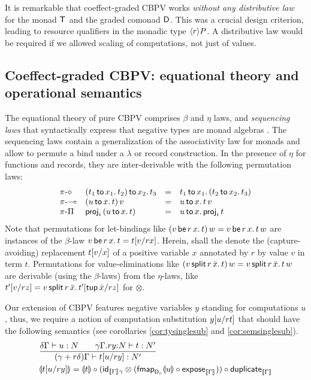 \documentclass[acmsmall,review,anonymous]{acmart}\settopmatter{printfolios=true,printccs=false,printacmref=false}
\begin{document}
It is remarkable that coeffect-graded CBPV works \emph{without any
  distributive law} \cite{orchard:icfp16}
for the monad $\T$ and the graded comonad $\D$.
%
This was a crucial design criterion, leading to resource qualifiers in
the monadic type $\compty r P$.
%
A distributive law would be required if we allowed scaling of
computations, not just of values.


\subsection{Coeffect-graded CBPV: equational theory and operational semantics}

The equational theory of pure CBPV comprises $\beta$ and $\eta$ laws,
and \emph{sequencing laws} that syntactically express that negative
types are monad algebras \citep[Fig.~11]{levi:hosc06}.  The sequencing
laws contain a generalization of the associativity law for monads and
allow to permute a bind under a $\lambda$ or record construction.  In
the presence of $\eta$ for functions and records, they are
inter-derivable with the following permutation laws:
\[
\begin{array}{llcl}
\rpi\diamond
  & \bind {x_2} {(\bind {x_1} {t_1} {t_2})} {t_3}
  & = & \bind {x_1} {t_1} {(\bind {x_2} {t_2} {t_3})}
\\
\rpi\lolli
  & \app {(\bind x u t)} v
  & = & \bind x u {\app t v}
\\
\rpi\Pi
  & \proj i {(\bind x  u t)}
  & = & \bind x u {\proj i t}
\end{array}
\]
Note that permutations for let-bindings like
$\app{(\qlet r x v t)}w = \qlet r x v {\app t w}$ are instances of the
$\beta$-law $\qlet r x v t = \qsubst v r x t$.
%
Herein,  shall the denote the
(capture-avoiding) replacement $\subst v x t$ of a positive variable
$x$ annotated by $r$ by value $v$ in term $t$.
%
Permutations for value-eliminations like
$\app {(\qsplits r v {\bar x} t)} w = \qsplits r v {\bar x} {\app t
  w}$
are derivable (using the $\beta$-laws) from the $\eta$-laws, like
$\qsubst{v}{r}{z}{t'} = \qsplits r {v} {\bar x} {\qsubst {\ptup {\bar
      x}} r z {t'}}$ for $\otimes$.

Our extension of CBPV features negative variables $y$ standing for
computations $u$, thus, we require a notion of computation
substitution $\qsubst u r t y$ that should have the following semantics
(see corollaries \ref{cor:tysinglesub} and \ref{cor:semsinglesub}).
\begin{align*}
&
  \ru{\qCompTy \delta \Gamma u N \qquad
      \oCompTy {\qext \gamma \Gamma r y N} t {N'}
    }{\pCompTy {\gamma + r\delta} \Gamma {\qsubst u r y t} {N'}}
\\ &
  \dent{\qsubst u r y t} = \dent t
    \comp (\tid[\den\Gamma \gamma]
             \otimes (\fmapt[{\D[r]}] \dent u \comp \expose[\den\Gamma]))
    \comp \duplicate[\den\Gamma]
\end{align*}
\end{document}
